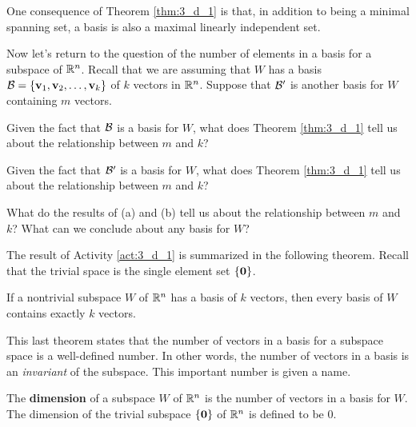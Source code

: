 One consequence of Theorem \ref{thm:3_d_1} is that, in addition to being a minimal spanning set, a basis is also a maximal linearly independent set. 



\begin{activity} \label{act:3_d_1} Now let's return to the question of the number of elements in a basis for a subspace of $\mathbb{R}^n$. Recall that we are assuming that $W$ has a basis $\mathcal{B} = \{\mathbf{v}_1, \mathbf{v}_2, \ldots, \mathbf{v}_k\}$ of $k$ vectors in $\mathbb{R}^n$.  Suppose that $\mathcal{B}'$ is another basis for $W$ containing $m$ vectors. 
	\ba
	\item Given the fact that $\mathcal{B}$ is a basis for $W$, what does Theorem \ref{thm:3_d_1} tell us about the relationship between $m$ and $k$? 



	\item Given the fact that $\mathcal{B}'$ is a basis for $W$, what does Theorem \ref{thm:3_d_1} tell us about the relationship between $m$ and $k$? 



	\item What do the results of (a) and (b) tell us about the relationship between $m$ and $k$? What can we conclude about any basis for $W$?



	\ea

\end{activity}



The result of Activity \ref{act:3_d_1} is summarized in the following theorem. Recall that the trivial space is the single element set $\{\mathbf{0}\}$. 



\begin{theorem} \label{thm:3_d_basis} If a nontrivial subspace $W$ of $\mathbb{R}^n$ has a basis of $k$ vectors, then every basis of $W$ contains exactly $k$ vectors.
\end{theorem}



This last theorem states that the number of vectors in a basis for a subspace space is a well-defined number. In other words, the number of vectors in a basis is an \emph{invariant} of the subspace. This important number is given a name.



\begin{definition} The \textbf{dimension} of a subspace $W$ of $\mathbb{R}^n$ is the number of vectors in a basis for $W$. The dimension of the trivial subspace $\{\mathbf{0}\}$ of $\mathbb{R}^n$ is defined to be 0.
\end{definition}



